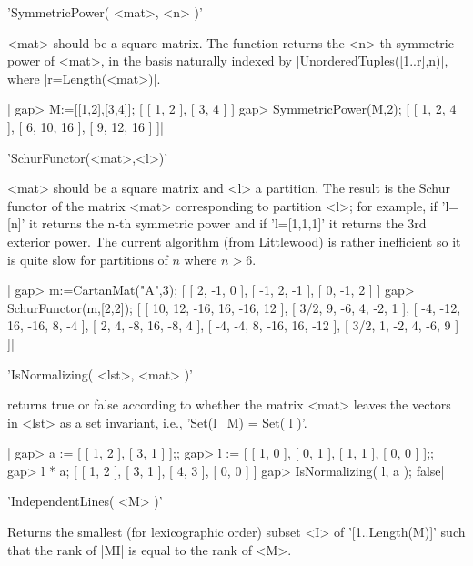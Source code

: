 
'SymmetricPower( <mat>, <n> )'

<mat>  should be  a square  matrix. The  function returns the <n>-th symmetric
power of <mat>, in the basis naturally indexed by |UnorderedTuples([1..r],n)|,
where |r=Length(<mat>)|.

|    gap> M:=[[1,2],[3,4]];
    [ [ 1, 2 ], [ 3, 4 ] ]
    gap> SymmetricPower(M,2);
    [ [ 1, 2, 4 ], [ 6, 10, 16 ], [ 9, 12, 16 ] ]|


'SchurFunctor(<mat>,<l>)'

<mat>  should be  a square  matrix and  <l> a  partition. The result is the
Schur  functor  of  the  matrix  <mat>  corresponding to partition <l>; for
example,  if 'l=[n]' it returns the n-th symmetric power and if 'l=[1,1,1]'
it  returns the 3rd exterior power. The current algorithm (from Littlewood)
is rather inefficient so it is quite slow for partitions of $n$ where $n>6$.

|    gap> m:=CartanMat("A",3);
    [ [ 2, -1, 0 ], [ -1, 2, -1 ], [ 0, -1, 2 ] ]
    gap> SchurFunctor(m,[2,2]);
    [ [ 10, 12, -16, 16, -16, 12 ], [ 3/2, 9, -6, 4, -2, 1 ],
      [ -4, -12, 16, -16, 8, -4 ], [ 2, 4, -8, 16, -8, 4 ],
      [ -4, -4, 8, -16, 16, -12 ], [ 3/2, 1, -2, 4, -6, 9 ] ]|


'IsNormalizing( <lst>, <mat> )'

returns true or  false according to whether  the matrix  <mat> leaves the
vectors in <lst> as a set invariant, i.e., 'Set(l \*\ M) = Set( l )'.

|    gap> a := [ [ 1, 2 ], [ 3, 1 ] ];;
    gap> l := [ [ 1, 0 ], [ 0, 1 ], [ 1, 1 ], [ 0, 0 ] ];;
    gap> l * a;
    [ [ 1, 2 ], [ 3, 1 ], [ 4, 3 ], [ 0, 0 ] ]
    gap> IsNormalizing( l, a );
    false|


'IndependentLines( <M> )'

Returns the smallest (for lexicographic order) subset <I> of '[1..Length(M)]'
such that the rank of |M{I}| is equal to the rank of <M>.

